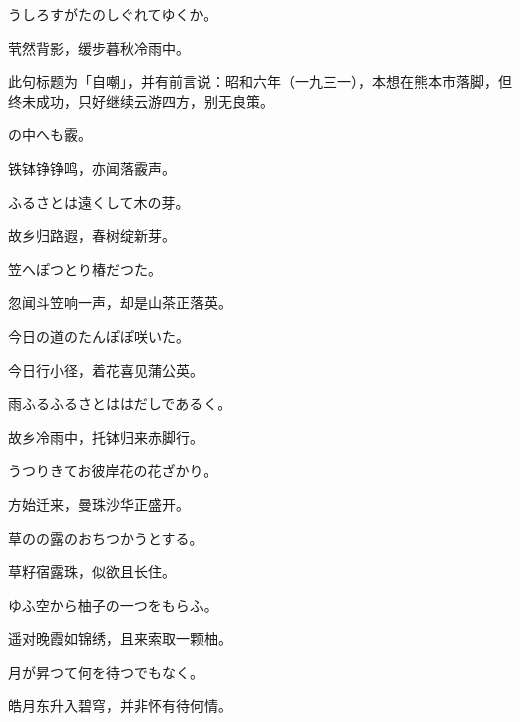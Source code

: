 \begin{haiku}
    {\FH うしろすがたのしぐれてゆくか。}

    {\FK 茕然背影，缓步暮秋冷雨中。}

    {\FS 此句标题为「自嘲」，并有前言说：昭和六年（一九三一），本想在熊本市落脚，但终未成功，只好继续云游四方，别无良策。}
\end{haiku}

\begin{haiku}
    {\FH {}の中へも霰。}

    {\FK 铁钵铮铮鸣，亦闻落霰声。}
\end{haiku}

\begin{haiku}
    {\FH ふるさとは遠くして木の芽。}

    {\FK 故乡归路遐，春树绽新芽。}
\end{haiku}

\begin{haiku}
    {\FH 笠へぽつとり椿だつた。}

    {\FK 忽闻斗笠响一声，却是山茶正落英。}
\end{haiku}

\begin{haiku}
    {\FH 今日の道のたんぽぽ咲いた。}

    {\FK 今日行小径，着花喜见蒲公英。}
\end{haiku}

\begin{haiku}
    {\FH 雨ふるふるさとははだしであるく。}

    {\FK 故乡冷雨中，托钵归来赤脚行。}
\end{haiku}

\begin{haiku}
    {\FH うつりきてお彼岸花の花ざかり。}

    {\FK 方始迁来，曼珠沙华正盛开。}
\end{haiku}

\begin{haiku}
    {\FH 草のの露のおちつかうとする。}

    {\FK 草籽宿露珠，似欲且长住。}
\end{haiku}

\begin{haiku}
    {\FH ゆふ空から柚子の一つをもらふ。}

    {\FK 遥对晚霞如锦绣，且来索取一颗柚。}
\end{haiku}

\begin{haiku}
    {\FH 月が昇つて何を待つでもなく。}

    {\FK 皓月东升入碧穹，并非怀有待何情。}
\end{haiku}


